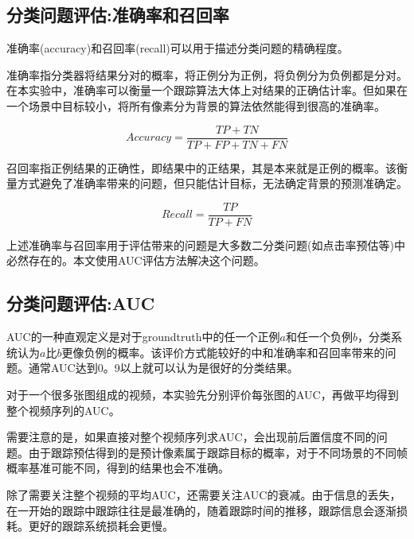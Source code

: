 \subsection{分类问题评估:准确率和召回率}
准确率(accuracy)和召回率(recall)可以用于描述分类问题的精确程度。
\par
准确率指分类器将结果分对的概率，将正例分为正例，将负例分为负例都是分对。在本实验中，准确率可以衡量一个跟踪算法大体上对结果的正确估计率。但如果在一个场景中目标较小，将所有像素分为背景的算法依然能得到很高的准确率。
\par
\begin{equation}\label{equ:accuracy}  Accuracy=\frac{TP+TN}{TP+FP+TN+FN}  \end{equation}
\par
召回率指正例结果的正确性，即结果中的正结果，其是本来就是正例的概率。该衡量方式避免了准确率带来的问题，但只能估计目标，无法确定背景的预测准确定。
\par
\begin{equation}\label{equ:recall}  Recall=\frac{TP}{TP+FN}  \end{equation}
\par
上述准确率与召回率用于评估带来的问题是大多数二分类问题(如点击率预估等)中必然存在的。本文使用AUC评估方法解决这个问题。

\subsection{分类问题评估:AUC} \label{section:auc}
AUC的一种直观定义是对于groundtruth中的任一个正例$a$和任一个负例$b$，分类系统认为$a$比$b$更像负例的概率。该评价方式能较好的中和准确率和召回率带来的问题。通常AUC达到0。9以上就可以认为是很好的分类结果。
\par
对于一个很多张图组成的视频，本实验先分别评价每张图的AUC，再做平均得到整个视频序列的AUC。
\par
需要注意的是，如果直接对整个视频序列求AUC，会出现前后置信度不同的问题。由于跟踪预估得到的是预计像素属于跟踪目标的概率，对于不同场景的不同帧概率基准可能不同，得到的结果也会不准确。
\par
除了需要关注整个视频的平均AUC，还需要关注AUC的衰减。由于信息的丢失，在一开始的跟踪中跟踪往往是最准确的，随着跟踪时间的推移，跟踪信息会逐渐损耗。更好的跟踪系统损耗会更慢。